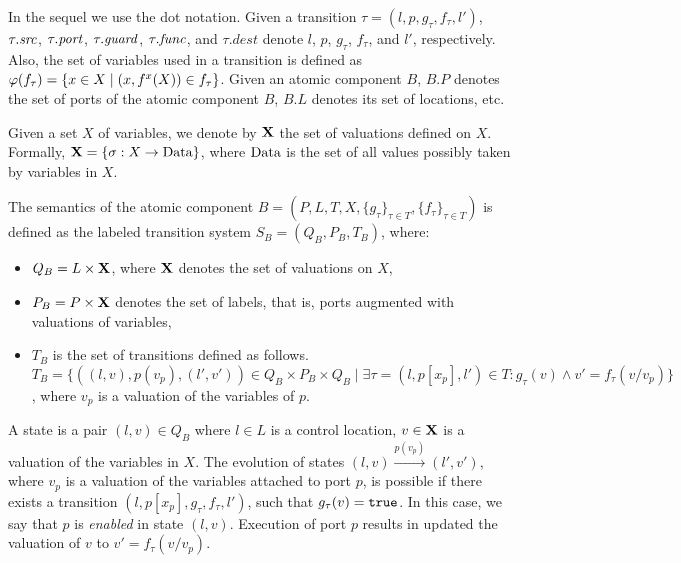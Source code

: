 In the sequel we use the dot notation.
Given a transition $\tau = (l,p,g_\tau,f_\tau,l')$, $\tau.\mathit{src}$, $\tau.\mathit{port}$, $\tau.\mathit{guard}$, $\tau.\mathit{func}$, and $\tau.dest$ denote $l$, $p$, $g_\tau$, $f_\tau$, and $l'$, respectively.
Also, the set of variables used in a transition is defined as $\varphi(f_\tau) = \{x \in X \mid (x,f^x(X)) \in f_\tau\}$.
Given an atomic component $B$, $B.P$ denotes the set of ports of the atomic component $B$, $B.L$ denotes its set of locations, etc.

Given a set $X$ of variables, we denote by $\mathbf{X}$ the set of valuations
defined on $X$. Formally, $\mathbf{X} = \{ \sigma : X \rightarrow \mathit{\mathrm{Data}}\}$, where
$\mathit{\mathrm{Data}}$ is the set of all values possibly taken by variables in $X$.

%
%
\begin{definition}
\label{def:semantic-atom}
The semantics of the atomic component $B = (P,L, T, X, \{g_{\tau}\}_{\tau \in T}, \{f_{\tau}\}_{\tau \in T})$ is defined as the labeled transition system  $S_B = (Q_B, P_B, T_B)$, where: 
\begin{itemize}
\item $Q_B = L\times \mathbf{X}$, where $\mathbf{X}$ denotes the set of valuations on $X$,
\item $P_B = P \times \mathbf{X}$ denotes the set of labels, that is, ports augmented with valuations of variables, 
\item $T_B$ is the set of transitions defined as follows. $T_B= \{ ((l,v),p(v_{p}), (l',v'))\in Q_B\times P_B\times Q_B \mid \exists \tau = (l, p[x_{p}], l') \in T: g_{\tau}(v) \wedge v'=f_{\tau}(v/v_{p})\}$, where $v_{p}$ is a valuation of the variables of $p$.  
\end{itemize}
\end{definition}
%
A state is a pair $(l,v)\in Q_B$ where $l \in L$ is a control location, $v \in \mathbf{X}$ is a valuation of the variables in $X$. The evolution of states $(l, v)\stackrel{p(v_{p})}{\rightarrow} (l', v')$, where $v_{p}$ is a valuation of the variables attached to port $p$, is possible if there exists a transition $(l, p[x_p], g_\tau, f_\tau, l')$, such that $g_\tau(v)=\mathtt{true}$. In this case, we say that $p$ is \emph{enabled} in state $(l, v)$. Execution of port $p$ results in updated the valuation of $v$ to $v'=f_\tau(v/v_p)$.

